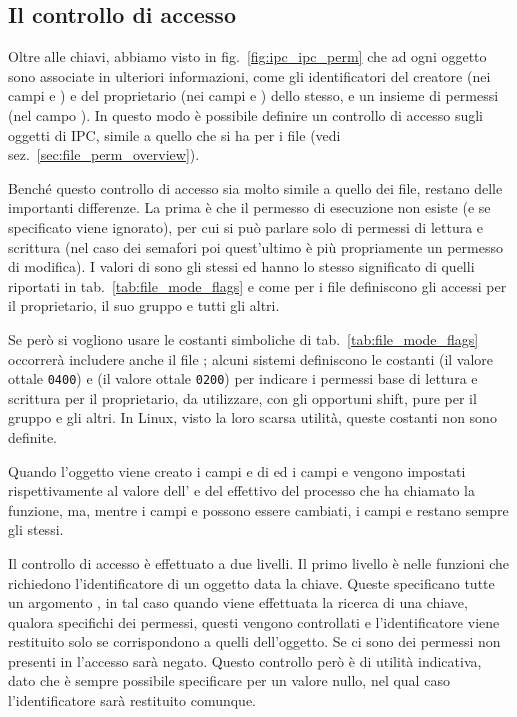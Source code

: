 \subsection{Il controllo di accesso}
\label{sec:ipc_sysv_access_control}

Oltre alle chiavi, abbiamo visto in fig.~\ref{fig:ipc_ipc_perm} che ad ogni
oggetto sono associate in  ulteriori informazioni, come gli
identificatori del creatore (nei campi  e ) e del
proprietario (nei campi  e ) dello stesso, e un insieme di
permessi (nel campo ). In questo modo è possibile definire un
controllo di accesso sugli oggetti di IPC, simile a quello che si ha per i
file (vedi sez.~\ref{sec:file_perm_overview}).

Benché questo controllo di accesso sia molto simile a quello dei file, restano
delle importanti differenze. La prima è che il permesso di esecuzione non
esiste (e se specificato viene ignorato), per cui si può parlare solo di
permessi di lettura e scrittura (nel caso dei semafori poi quest'ultimo è più
propriamente un permesso di modifica). I valori di  sono gli stessi
ed hanno lo stesso significato di quelli riportati in
tab.~\ref{tab:file_mode_flags} e come per i file definiscono gli accessi per
il proprietario, il suo gruppo e tutti gli altri. 

Se però si vogliono usare le costanti simboliche di
tab.~\ref{tab:file_mode_flags} occorrerà includere anche il file
; alcuni sistemi definiscono le costanti 
(il valore ottale \texttt{0400}) e  (il valore ottale
\texttt{0200}) per indicare i permessi base di lettura e scrittura per il
proprietario, da utilizzare, con gli opportuni shift, pure per il gruppo e gli
altri. In Linux, visto la loro scarsa utilità, queste costanti non sono
definite.

Quando l'oggetto viene creato i campi  e  di
 ed i campi  e  vengono impostati
rispettivamente al valore dell' e del  effettivo del processo
che ha chiamato la funzione, ma, mentre i campi  e  possono
essere cambiati, i campi  e  restano sempre gli stessi.

Il controllo di accesso è effettuato a due livelli. Il primo livello è nelle
funzioni che richiedono l'identificatore di un oggetto data la chiave. Queste
specificano tutte un argomento , in tal caso quando viene
effettuata la ricerca di una chiave, qualora  specifichi dei
permessi, questi vengono controllati e l'identificatore viene restituito solo
se corrispondono a quelli dell'oggetto. Se ci sono dei permessi non presenti
in  l'accesso sarà negato. Questo controllo però è di utilità
indicativa, dato che è sempre possibile specificare per  un valore
nullo, nel qual caso l'identificatore sarà restituito comunque.

